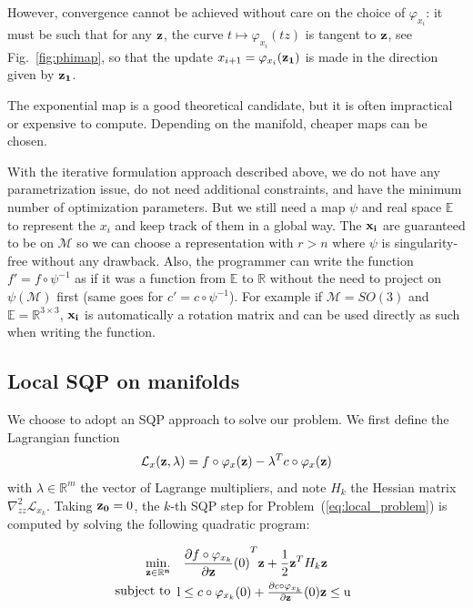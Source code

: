 However, convergence cannot be achieved without care on the choice of $\varphi_{x_i}$: it must be such that for any ${\bf z}$, the curve $t \mapsto \varphi_{x_i}(tz)$ is tangent to ${\bf z}$, see Fig.~\ref{fig:phimap}, so that the update $x_{i+1} = \varphi_{x_i}({\bf z_1})$ is made in the direction given by ${\bf z_1}$.

The exponential map is a good theoretical candidate, but it is often impractical or expensive to compute.
Depending on the manifold, cheaper maps can be chosen.

With the iterative formulation approach described above, we do not have any parametrization issue, do not need additional constraints, and have the minimum number of optimization parameters.
But we still need a map $\psi$ and real space $\mathbb{E}$ to represent the $x_i$ and keep track of them in a global way.
The ${\bf x_i}$ are guaranteed to be on $\mathcal{M}$ so we can choose a representation with $r>n$ where $\psi$ is singularity-free without any drawback.
Also, the programmer can write the function $f' = f \circ \psi^{-1}$ as if it was a function from $\mathbb{E}$ to $\mathbb{R}$ without the need to project on $\psi(\mathcal{M})$ first (same goes for $c' = c \circ \psi^{-1}$).
For example if $\mathcal{M} = SO(3)$ and $\mathbb{E} = \mathbb{R}^{3\times 3}$, ${\bf x_i}$ is automatically a rotation matrix and can be used directly as such when writing the function.

\subsection{Local SQP on manifolds}
\label{local_sqp_on_manifolds}
We choose to adopt an SQP approach to solve our problem.
We first define the Lagrangian function
\begin{equation}
  \mathcal{L}_x ({\bf z}, \lambda) = f\circ \varphi_x({\bf z}) - \lambda^T c \circ \varphi_x({\bf z})
\end{equation}
with $\lambda \in \mathbb{R}^m$ the vector of Lagrange multipliers, and note $H_k$ the Hessian matrix $\nabla_{zz}^2 \mathcal{L}_{x_k}$.
Taking ${\bf z_0} = 0$, the $k$-th SQP step for Problem~(\ref{eq:local_problem}) is computed by solving the following quadratic program:

\begin{align}
  \label{eq:SQPStep}
  \minimize_{\bf z \in \mathbb{R}^n } & \quad {\frac{\partial f\circ \varphi_{x_k}}{\partial {\bf z}}(0)}^T {\bf z } + \frac{1}{2} {\bf z }^T H_k{\bf z }\\
  \text{subject to}&
  \begin{array}{lr}
    \text{l} \leq c\circ \varphi_{x_k}(0) + \frac{\partial c\circ \varphi_{x_k}}{\partial {\bf z}}(0) {\bf z }\leq \text{u}\\
  \end{array} \nonumber%
\end{align}

